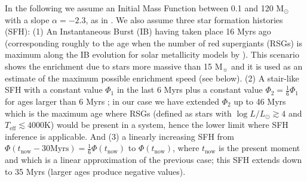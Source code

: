 \documentclass{aa} %
\begin{document}
In the following we assume an Initial Mass Function between 0.1 and 120 M$_{\odot}$ with a slope $\alpha = -2.3$, as in \cite{com16}. We also assume three star formation histories (SFH): (1) An Instantaneous Burst (IB) having taken place 16 Myrs ago (corresponding roughly to the age when the number of red supergiants (RSGs) is maximum along the IB evolution for solar metallicity models by \citealt{ekstrom12}). This scenario shows the enrichment due to stars more massive than 15 $\mathrm{M}_\sun$ and it is used as an estimate of the maximum possible enrichment speed (see below). (2) A stair-like SFH with a constant value $\Phi_1$ in the last 6 Myrs plus a constant value $\Phi_2 = \frac{1}{6}\Phi_1$ for ages larger than 6 Myrs \citep[see again][]{com16}; in our case we have extended $\Phi_2$ up to 46 Myrs which is the maximum age where RSGs (defined as stars with $\log L/L_{\odot} \gtrsim 4$ and $T_\mathrm{eff} \lesssim 4000 \mathrm{K}$) would be present in a system, hence the lower limit where \cite{com16} SFH inference is applicable. And (3) a linearly increasing SFH from $\Phi(t_\mathrm{now} - 30 \mathrm{Myrs}) =  \frac{1}{6} \Phi(t_\mathrm{now})$ to  $\Phi(t_\mathrm{now})$, where $t_\mathrm{now}$ is the present moment and which is a linear approximation of the previous case; this SFH extends down to 35 Myrs (larger ages produce negative values). 
\end{document}
